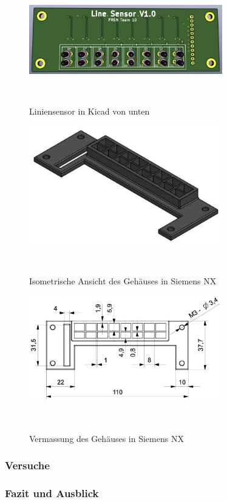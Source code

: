 \documentclass{article}
\begin{document}
\begin{figure}[H]
    \centering
    \includegraphics[width=0.75\textwidth]{Liniensensor_Bottom.pdf}
    \caption{Liniensensor in Kicad von unten}~\label{fig:Liniensensor_Bottom}
\end{figure}

\begin{figure}[H]
    \centering
    \includegraphics[width=0.75\textwidth]{Gehaeuse_Isometrisch.pdf}
    \caption{Isometrische Ansicht des Gehäuses in Siemens NX}~\label{fig:Gehaeuse_Isometrisch}
\end{figure}

\begin{figure}[H]
    \centering
    \includegraphics[width=0.75\textwidth]{Gehaeuse_Vermasst.pdf}
    \caption{Vermassung des Gehäuses in Siemens NX}~\label{fig:Gehaeuse_Vermasst}
\end{figure}

\subsubsection{Versuche}

\subsubsection{Fazit und Ausblick}

\end{document}
